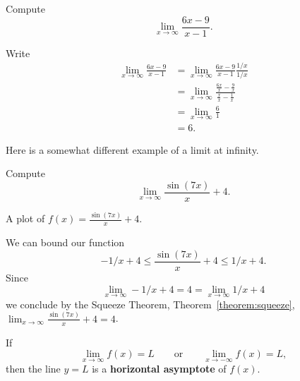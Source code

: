 \begin{example} Compute
\[
\lim_{x\to\infty} \frac{6x-9}{x-1}.
\]
\end{example}


\begin{solution}
Write
\begin{align*}
\lim_{x\to\infty}\frac{6x-9}{x-1} &= \lim_{x\to\infty}\frac{6x-9}{x-1} \frac{1/x}{1/x}\\
&=\lim_{x\to\infty}\frac{\frac{6x}{x} - \frac{9}{x}}{\frac{x}{x} - \frac{1}{x}}\\
&= \lim_{x\to\infty} \frac{6}{1}\\
&= 6.
\end{align*}
\end{solution}


Here is a somewhat different example of a limit at infinity.

\begin{example}
Compute
\[
\lim_{x\to \infty} \frac{\sin(7x)}{x}+4.
\]
\end{example}

\begin{marginfigure}[0in]
\caption{A plot of $f(x)=\frac{\sin(7x)}{x}+4$.}
\label{plot:sin7x/x+4}
\end{marginfigure}

\begin{solution}
We can bound our function
\[
-1/x + 4 \le \frac{\sin(7x)}{x}+4 \le 1/x + 4.
\]
Since 
\[
\lim_{x\to \infty} -1/x + 4 = 4 = \lim_{x\to \infty}1/x + 4
\] 
we conclude by the Squeeze Theorem, Theorem~\ref{theorem:squeeze},
$\lim_{x\to\infty}\frac{\sin(7x)}{x}+4 = 4$.
\end{solution}






\begin{definition}\label{def:horiz asymptote}
If  
\[
\lim_{x\to \infty} f(x) = L \qquad\text{or}\qquad \lim_{x\to -\infty} f(x) = L,
\]
then the line $y=L$ is a \textbf{horizontal asymptote} of $f(x)$.
\end{definition}

